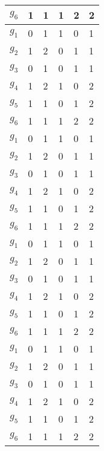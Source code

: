\begin{longtable}[c]{|l|l|l|l|l|l|}
	$g_6$&1&1&1&2&2\\ \hline
%
	$g_1$&0&1&1&0&1\\ \hline
	$g_2$&1&2&0&1&1\\ \hline
	$g_3$&0&1&0&1&1\\ \hline
	$g_4$&1&2&1&0&2\\ \hline
	$g_5$&1&1&0&1&2\\ \hline
	$g_6$&1&1&1&2&2\\ \hline
%
	$g_1$&0&1&1&0&1\\ \hline
	$g_2$&1&2&0&1&1\\ \hline
	$g_3$&0&1&0&1&1\\ \hline
	$g_4$&1&2&1&0&2\\ \hline
	$g_5$&1&1&0&1&2\\ \hline
	$g_6$&1&1&1&2&2\\ \hline
%
	$g_1$&0&1&1&0&1\\ \hline
	$g_2$&1&2&0&1&1\\ \hline
	$g_3$&0&1&0&1&1\\ \hline
	$g_4$&1&2&1&0&2\\ \hline
	$g_5$&1&1&0&1&2\\ \hline
	$g_6$&1&1&1&2&2\\ \hline
%
	$g_1$&0&1&1&0&1\\ \hline
	$g_2$&1&2&0&1&1\\ \hline
	$g_3$&0&1&0&1&1\\ \hline
	$g_4$&1&2&1&0&2\\ \hline
	$g_5$&1&1&0&1&2\\ \hline
	$g_6$&1&1&1&2&2\\ \hline
\end{longtable}
\normalsize%
\endgroup
